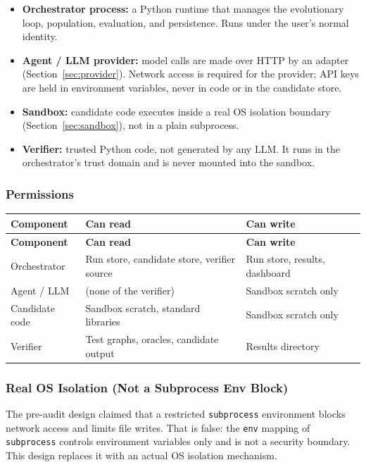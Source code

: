 \documentclass[12pt,a4paper]{article}
\begin{document}
\begin{itemize}[noitemsep]
  \item \textbf{Orchestrator process:} a Python runtime that manages the evolutionary loop, population, evaluation, and persistence. Runs under the user's normal identity.
  \item \textbf{Agent / LLM provider:} model calls are made over HTTP by an adapter (Section~\ref{sec:provider}). Network access is required for the provider; API keys are held in environment variables, never in code or in the candidate store.
  \item \textbf{Sandbox:} candidate code executes inside a real OS isolation boundary (Section~\ref{sec:sandbox}), not in a plain subprocess.
  \item \textbf{Verifier:} trusted Python code, not generated by any LLM. It runs in the orchestrator's trust domain and is never mounted into the sandbox.
\end{itemize}

\subsubsection{Permissions}

\begin{longtable}{|p{3cm}|p{5cm}|p{5cm}|}
\hline
\textbf{Component} & \textbf{Can read} & \textbf{Can write} \\
\hline
\endfirsthead
\hline
\textbf{Component} & \textbf{Can read} & \textbf{Can write} \\
\hline
\endhead
\hline
\endfoot

Orchestrator & Run store, candidate store, verifier source & Run store, results, dashboard \\
\hline
Agent / LLM & (none of the verifier) & Sandbox scratch only \\
\hline
Candidate code & Sandbox scratch, standard libraries & Sandbox scratch only \\
\hline
Verifier & Test graphs, oracles, candidate output & Results directory \\
\hline
\end{longtable}

\label{sec:sandbox}
\subsubsection{Real OS Isolation (Not a Subprocess Env Block)}

The pre-audit design claimed that a restricted \texttt{subprocess} environment blocks network access and limits file writes. That is false: the \texttt{env} mapping of \texttt{subprocess} controls environment variables only and is not a security boundary. This design replaces it with an actual OS isolation mechanism.
\end{document}
